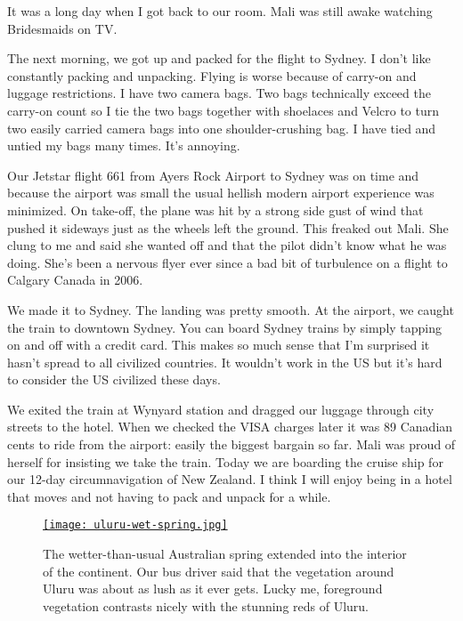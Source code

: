 It was a long day when I got back to our room. Mali was still awake
watching Bridesmaids on TV.

The next morning, we got up and packed for the flight to Sydney. I don't
like constantly packing and unpacking. Flying is worse because of
carry-on and luggage restrictions. I have two camera bags. Two bags
technically exceed the carry-on count so I tie the two bags together
with shoelaces and Velcro to turn two easily carried camera bags into
one shoulder-crushing bag. I have tied and untied my bags many times.
It's annoying.

Our Jetstar flight 661 from Ayers Rock Airport to Sydney was on time and
because the airport was small the usual hellish modern airport
experience was minimized. On take-off, the plane was hit by a strong
side gust of wind that pushed it sideways just as the wheels left the
ground. This freaked out Mali. She clung to me and said she wanted off
and that the pilot didn't know what he was doing. She's been a nervous
flyer ever since a bad bit of turbulence on a flight to Calgary Canada
in 2006.

We made it to Sydney. The landing was pretty smooth. At the airport, we
caught the train to downtown Sydney. You can board Sydney trains by
simply tapping on and off with a credit card. This makes so much sense
that I'm surprised it hasn't spread to all civilized countries. It
wouldn't work in the US but it's hard to consider the US civilized these
days.

We exited the train at Wynyard station and dragged our luggage through
city streets to the hotel. When we checked the VISA charges later it was
89 Canadian cents to ride from the airport: easily the biggest bargain
so far. Mali was proud of herself for insisting we take the train. Today
we are boarding the cruise ship for our 12-day circumnavigation of New
Zealand. I think I will enjoy being in a hotel that moves and not having
to pack and unpack for a while.


\captionsetup[figure]{labelformat=empty}
\begin{SCfigure}[50]
\centering
\href{https://conceptcontrol.smugmug.com/Trips/Overseas/Australia-New-Zealand-2022/i-W97WzvW/A}{\texttt{[image: uluru-wet-spring.jpg]}}
\caption[Uluru in spring]{The wetter-than-usual Australian spring extended into the
interior of the continent. Our bus driver said that the vegetation
around Uluru was about as lush as it ever gets. Lucky me, foreground
vegetation contrasts nicely with the stunning reds of Uluru.}
\label{fig:7573x4}
\end{SCfigure}

%

